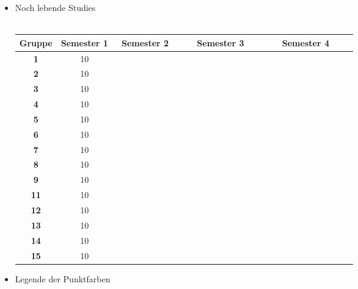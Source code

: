 \documentclass[a4paper, 10pt]{report}
\begin{document}
\begin{itemize}
\begin{tabular}{|c||c|c|c|c|c|}
    \hline & & & & \\ \textbf{11} & & & & \\ & & & & \\
    \hline & & & & \\ \textbf{12} & & & & \\ & & & & \\
    \hline & & & & \\ \textbf{13} & & & & \\ & & & & \\
    \hline & & & & \\ \textbf{14} & & & & \\ & & & & \\
    \hline & & & & \\ \textbf{15} & & & & \\ & & & & \\
    \hline
  \end{tabular}

\item Noch lebende Studies \\\\
  \begin{tabular}{|c||c|c|c|c|}
    \hline \textbf{Gruppe} & \textbf{Semester 1} & \textbf{\ Semester 2\ \ } & \textbf{\ \ Semester 3\ \ } & \textbf{\ \ \ \ Semester 4\ \ \ \ } \\
    \hline
    \hline \textbf{1}  & 10 & & & \\
    \hline \textbf{2}  & 10 & & & \\
    \hline \textbf{3}  & 10 & & & \\
    \hline \textbf{4}  & 10 & & & \\
    \hline \textbf{5}  & 10 & & & \\
    \hline \textbf{6}  & 10 & & & \\
    \hline \textbf{7}  & 10 & & & \\
    \hline \textbf{8}  & 10 & & & \\
    \hline \textbf{9}  & 10 & & & \\
    \hline \textbf{11} & 10 & & & \\
    \hline \textbf{12} & 10 & & & \\
    \hline \textbf{13} & 10 & & & \\
    \hline \textbf{14} & 10 & & & \\
    \hline \textbf{15} & 10 & & & \\
    \hline
  \end{tabular}

\item Legende der Punktfarben


\end{itemize}
\end{document}
